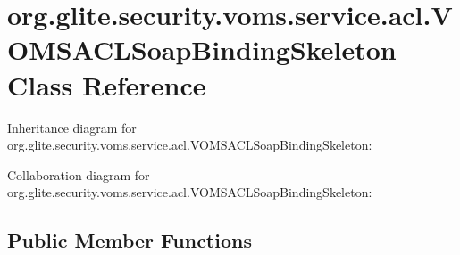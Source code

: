 \hypertarget{classorg_1_1glite_1_1security_1_1voms_1_1service_1_1acl_1_1VOMSACLSoapBindingSkeleton}{
\section{org.glite.security.voms.service.acl.VOMSACLSoapBindingSkeleton Class Reference}
\label{classorg_1_1glite_1_1security_1_1voms_1_1service_1_1acl_1_1VOMSACLSoapBindingSkeleton}
}


Inheritance diagram for org.glite.security.voms.service.acl.VOMSACLSoapBindingSkeleton:


Collaboration diagram for org.glite.security.voms.service.acl.VOMSACLSoapBindingSkeleton:
\subsection*{Public Member Functions}
